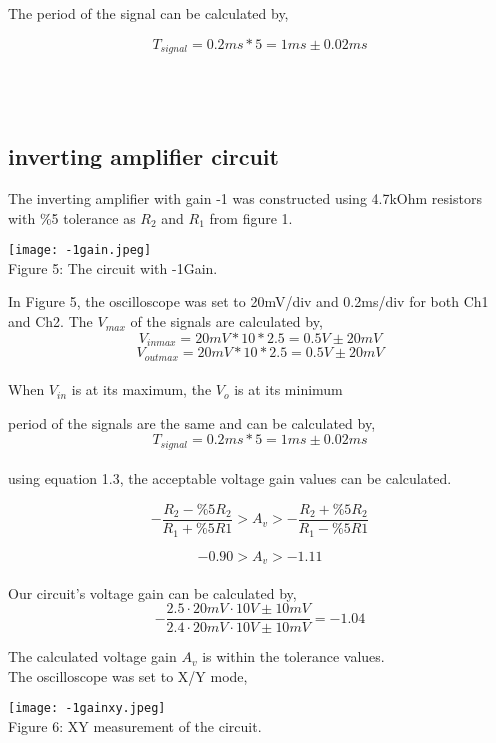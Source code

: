 \documentclass{article}
\begin{document}
The period of the signal can be calculated by,

\[T_{signal} = 0.2ms * 5 = 1ms \pm 0.02ms\]
\\
\\
\\
\subsection{inverting amplifier circuit}
The inverting amplifier with gain -1 was constructed using 4.7kOhm resistors with \%5 tolerance as $R_2$ and $R_1$ from figure 1. \\

\begin{center}
    \texttt{[image: -1gain.jpeg]} \\
    Figure 5: The circuit with -1Gain.
\end{center}

In Figure 5, the oscilloscope was set to 20mV/div and 0.2ms/div for both Ch1 and Ch2. The $V_{max}$ of the signals are calculated by,
\[V_{inmax} = 20mV * 10 * 2.5 = 0.5V \pm 20mV\]
\[V_{outmax} = 20mV * 10 * 2.5 = 0.5V \pm 20mV\] \\

When $V_{in}$ is at its maximum, the $V_o$ is at its minimum  

period of the signals are the same and can be calculated by,
\[T_{signal} = 0.2ms * 5 = 1ms \pm 0.02ms\] \\

using equation 1.3, the acceptable voltage gain values can be calculated.

\[-\frac{R_2 - \%5R_2}{R_1 + \%5R1} > A_v > -\frac{R_2 +   \%5R_2}{R_1 - \%5R1}  \]

\[-0.90 > A_v > -1.11\] \\

Our circuit's voltage gain can be calculated by,
\[-\frac{2.5\cdot20mV\cdot10V\pm10mV}{2.4\cdot20mV\cdot10V\pm10mV} = -1.04\]

The calculated voltage gain $A_v$ is within the tolerance values.\\

The oscilloscope was set to X/Y mode,

\begin{center}
    \texttt{[image: -1gainxy.jpeg]}\\
    Figure 6: XY measurement of the circuit.
\end{center}
\end{document}

